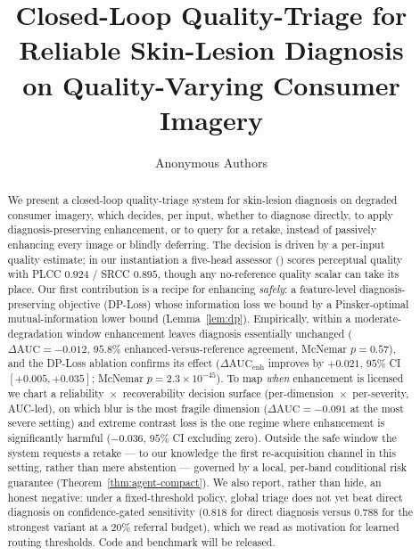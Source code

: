 \documentclass{article}
\title{Closed-Loop Quality-Triage for Reliable Skin-Lesion Diagnosis\\
on Quality-Varying Consumer Imagery}
\author{Anonymous Authors}
\date{}
\begin{document}
\maketitle

\begin{abstract}
We present a closed-loop quality-triage system for skin-lesion diagnosis on degraded consumer
imagery, which decides, per input, whether to diagnose directly, to apply diagnosis-preserving
enhancement, or to query for a retake, instead of passively enhancing every image or blindly
deferring. The decision is driven by a per-input quality estimate; in our instantiation a five-head
assessor (\visiscore) scores perceptual quality with PLCC $0.924$ / SRCC $0.895$, though any
no-reference quality scalar can take its place. Our first contribution is a recipe for enhancing
\emph{safely}: a feature-level diagnosis-preserving objective (DP-Loss) whose information loss we bound
by a Pinsker-optimal mutual-information lower bound (Lemma~\ref{lem:dp}). Empirically, within a
moderate-degradation window enhancement leaves diagnosis essentially unchanged ($\Delta\mathrm{AUC}=
-0.012$, $95.8\%$ enhanced-versus-reference agreement, McNemar $p=0.57$), and the DP-Loss ablation
confirms its effect ($\Delta\mathrm{AUC}_{\text{enh}}$ improves by $+0.021$, $95\%$ CI
$[+0.005,+0.035]$; McNemar $p=2.3\times10^{-45}$). To map \emph{when} enhancement is licensed we chart
a reliability~$\times$~recoverability decision surface (per-dimension~$\times$~per-severity, AUC-led),
on which blur is the most fragile dimension ($\Delta\mathrm{AUC}=-0.091$ at the most severe setting)
and extreme contrast loss is the one regime where enhancement is significantly harmful
($-0.036$, $95\%$ CI excluding zero). Outside the safe window the system requests a retake --- to our
knowledge the first re-acquisition channel in this setting, rather than mere abstention --- governed by
a local, per-band conditional risk guarantee (Theorem~\ref{thm:agent-compact}). We also report,
rather than hide, an honest negative: under a fixed-threshold policy, global triage does not yet beat
direct diagnosis on confidence-gated sensitivity ($0.818$ for direct diagnosis versus $0.788$ for the
strongest variant at a $20\%$ referral budget), which we read as motivation for learned routing
thresholds. Code and benchmark will be released.
\end{abstract}
\end{document}
